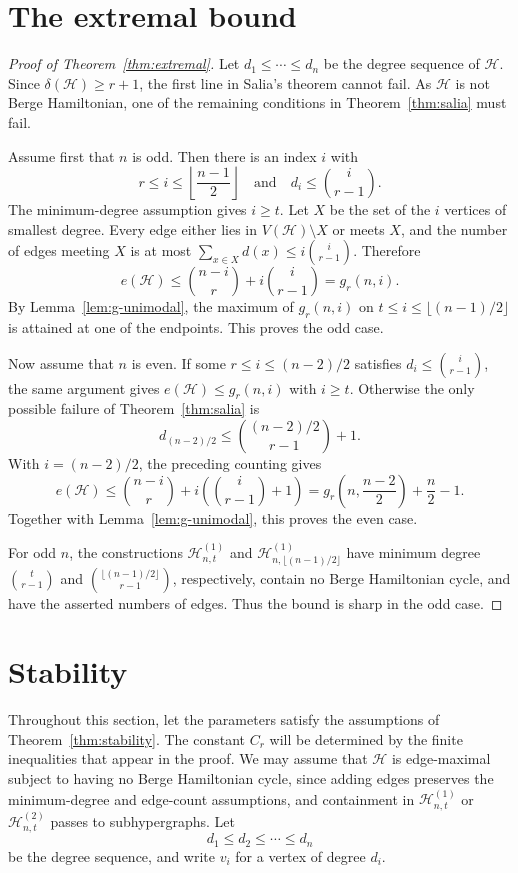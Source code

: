 \documentclass[12pt]{article}
\newcommand{\Hcal}{\mathcal H}
\begin{document}
\section{The extremal bound}\label{sec:extremal-bound}

\begin{proof}[Proof of Theorem~\ref{thm:extremal}]
Let $d_1\le\cdots\le d_n$ be the degree sequence of $\Hcal$.
Since $\delta(\Hcal)\ge r+1$, the first line in Salia's theorem cannot
fail.  As $\Hcal$ is not Berge Hamiltonian, one of the remaining
conditions in Theorem~\ref{thm:salia} must fail.

Assume first that $n$ is odd.  Then there is an index
$i$ with
$$
        r\le i\le \left\lfloor\frac{n-1}{2}\right\rfloor
        \quad\text{and}\quad
        d_i\le \binom{i}{r-1}.
$$
The minimum-degree assumption gives $i\ge t$.  Let $X$ be the set of the
$i$ vertices of smallest degree.  Every edge either lies in $V(\Hcal)\setminus X$
or meets $X$, and the number of edges meeting $X$ is at most
$\sum_{x\in X}d(x)\le i\binom{i}{r-1}$.  Therefore
$$
        e(\Hcal)\le \binom{n-i}{r}+i\binom{i}{r-1}=g_r(n,i).
$$
By Lemma~\ref{lem:g-unimodal}, the maximum of $g_r(n,i)$ on
$t\le i\le \lfloor(n-1)/2\rfloor$ is attained at one of the endpoints.
This proves the odd case.

Now assume that $n$ is even.  If some
$r\le i\le (n-2)/2$ satisfies $d_i\le \binom{i}{r-1}$, the same argument
gives $e(\Hcal)\le g_r(n,i)$ with $i\ge t$.  Otherwise the only possible
failure of Theorem~\ref{thm:salia} is
$$
        d_{(n-2)/2}\le \binom{(n-2)/2}{r-1}+1.
$$
With $i=(n-2)/2$, the preceding counting gives
$$
        e(\Hcal)
        \le \binom{n-i}{r}
           +i\left(\binom{i}{r-1}+1\right)
        =g_r\left(n,\frac{n-2}{2}\right)+\frac n2-1.
$$
Together with Lemma~\ref{lem:g-unimodal}, this proves the even case.

For odd $n$, the constructions $\Hcal^{(1)}_{n,t}$ and
$\Hcal^{(1)}_{n,\lfloor(n-1)/2\rfloor}$ have minimum degree
$\binom{t}{r-1}$ and
$\binom{\lfloor(n-1)/2\rfloor}{r-1}$, respectively, contain no Berge
Hamiltonian cycle, and have the asserted numbers of edges.  Thus the
bound is sharp in the odd case.
\end{proof}

\section{Stability}\label{sec:stability}

Throughout this section, let the parameters satisfy the assumptions of
Theorem~\ref{thm:stability}.  The constant $C_r$ will be determined by
the finite inequalities that appear in the proof.  We may assume that
$\Hcal$ is edge-maximal subject to having no Berge Hamiltonian cycle,
since adding edges preserves the minimum-degree and edge-count
assumptions, and containment in $\Hcal^{(1)}_{n,t}$ or
$\Hcal^{(2)}_{n,t}$ passes to subhypergraphs.
Let
$$
        d_1\le d_2\le \cdots\le d_n
$$
be the degree sequence, and write $v_i$ for a vertex of degree $d_i$.
\end{document}
